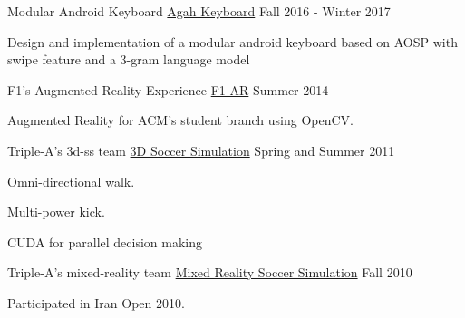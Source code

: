 \begin{cventries}
\cventry
    {Modular Android Keyboard} %
    {\href{https://github.com/Separius/AgahKeyboard}{Agah Keyboard}} %
    {} %
    {Fall 2016 - Winter 2017} %
    {
      \begin{cvitems} %
        \item {Design and implementation of a modular android keyboard based on AOSP with swipe feature and a 3-gram language model}
      \end{cvitems}
    }

  \cventry
    {F1’s Augmented Reality Experience} %
    {\href{https://github.com/Separius/UT-ACM-F1-AR}{F1-AR}} %
    {} %
    {Summer 2014} %
    {
      \begin{cvitems} %
        \item {Augmented Reality for ACM's student branch using OpenCV.}
      \end{cvitems}
    }
    
  \cventry
    {Triple-A's 3d-ss team} %
    {\href{https://github.com/Separius/TripleA-3DSoccerSimulation}{3D Soccer Simulation}} %
    {} %
    {Spring and Summer 2011} %
    {
      \begin{cvitems} %
        \item {Omni-directional walk.}
        \item {Multi-power kick.}
        \item {CUDA for parallel decision making}
      \end{cvitems}
    }
    
    \cventry
    {Triple-A's mixed-reality team} %
    {\href{https://github.com/Separius/TripleA-MixedReality}{Mixed Reality Soccer Simulation}} %
    {} %
    {Fall 2010} %
    {
      \begin{cvitems} %
        \item {Participated in Iran Open 2010.}
      \end{cvitems}
    }

\end{cventries}
